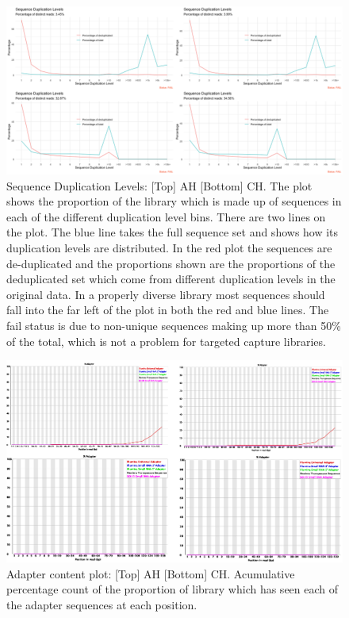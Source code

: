 \documentclass{article}
\begin{document}
\begin{figure}[h] \hspace*{0cm} 
\begin{center}
    \includegraphics[scale=0.25]{fastqcr/p5}
	\caption{Sequence Duplication Levels:  [Top] AH [Bottom] CH.
	The plot shows the proportion of the library which is made up of sequences in each of the different duplication level bins. There are two lines on the plot. The blue line takes the full sequence set and shows how its duplication levels are distributed. In the red plot the sequences are de-duplicated and the proportions shown are the proportions of the deduplicated set which come from different duplication levels in the original data.
In a properly diverse library most sequences should fall into the far left of the plot in both the red and blue lines.
The fail status is due to non-unique sequences making up more than 50\% of the total, which is not a problem for targeted capture libraries.}
	\label{fig:p5}
\end{center}
\end{figure}

\begin{figure}[h] \hspace*{0cm} 
\begin{center}
    \includegraphics[scale=0.4]{fastqc/p6}
	\caption{Adapter content plot:  [Top] AH [Bottom] CH. Acumulative percentage count of the proportion of library which has seen each of the adapter sequences at each position.}
	\label{fig:p6}
\end{center}
\end{figure}
\end{document}

